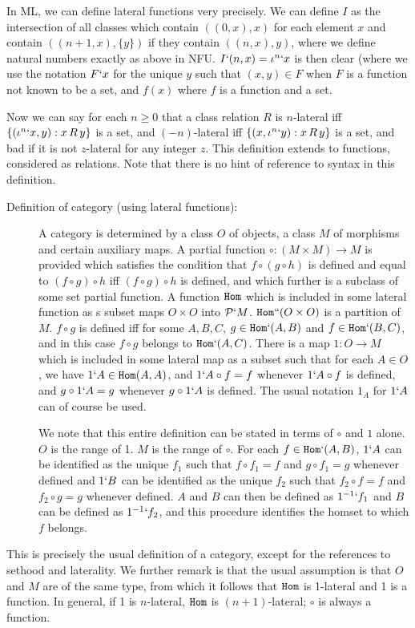 \documentclass[12pt]{article}
\begin{document}
In ML, we can define lateral functions very precisely.  We can define $I$ as the intersection of all classes which contain $((0,x),x)$ for each element $x$ and contain
$((n+1,x),\{y\})$ if they contain $((n,x),y)$, where we define natural numbers exactly as above in NFU.  $I`(n,x) = \iota^n`x$ is then clear (where we use the notation
$F`x$ for the unique $y$ such that $(x,y)\in F$ when $F$ is a function not known to be a set, and $f(x)$ where $f$ is a function and a set.

Now we can say for each $n\geq 0$ that a class relation $R$ is $n$-lateral iff $\{(\iota^n`x,y):x \,R\,y\}$ is a set, and $(-n)$-lateral iff $\{(x,\iota^n`y):x \,R\,y\}$ is a set,
and bad if it is not $z$-lateral for any integer $z$.  This definition extends to functions, considered as relations.  Note that there is no hint of reference to syntax in this definition.


\begin{description}

\item[Definition of category (using lateral functions):]  A category is determined by a class $O$ of objects, a class $M$ of morphisms and certain auxiliary maps.  A partial function $\circ:(M \times M) \rightarrow M$ is provided
which satisfies the condition that $f \circ (g \circ h)$ is defined and equal to $(f \circ g) \circ h$ iff $(f \circ g) \circ h$ is defined, and which further is a subclass of some set partial function.
A function ${\tt Hom}$ which is included in some lateral function as s subset  maps $O \times O$ into ${\cal P}`M$.  ${\tt Hom}``(O\times O)$ is a partition of $M$.  $f \circ g$ is defined iff
for some $A,B,C$, $g \in {\tt Hom}`(A,B)$ and $f \in {\tt Hom}`(B,C)$, and in this case $f \circ g$ belongs to ${\tt Hom}`(A,C)$.  There is a  map $1:O \rightarrow M$ which is included in some lateral map as a subset such
that for each $A \in O$, we have $1`A \in {\tt Hom}(A,A)$, and $1`A \circ f = f$ whenever $1`A \circ f$ is defined, and $g \circ 1`A = g$ whenever $g \circ 1`A$ is defined.
The usual notation $1_A$ for $1`A$ can of course be used.

We note that this entire definition can be stated in terms of $\circ$ and $1$ alone.  $O$ is the range of 1.  $M$ is the range of $\circ$.  For each $f \in {\tt Hom}`(A,B)$,
$1`A$ can be identified as the unique $f_1$ such that $f \circ f_1 = f$ and $g \circ f_1 = g$ whenever defined and $1`B$ can be identified as the unique $f_2$ such that
$f_2 \circ f = f$ and $f_2 \circ g = g$ whenever defined.  $A$ and $B$ can then be defined as $1^{-1}`f_1$ and $B$ can be defined as $1^{-1}`f_2$, and this procedure identifies the homset to which $f$ belongs.

\end{description}

This is precisely the usual definition of a category, except for the references to sethood and laterality.  We further remark is that the usual assumption is that $O$ and $M$ are of the same type,
from which it follows that ${\tt Hom}$ is 1-lateral and 1 is a function.  In general, if 1 is $n$-lateral, ${\tt Hom}$ is $(n+1)$-lateral; $\circ$ is always a function.
\end{document}
